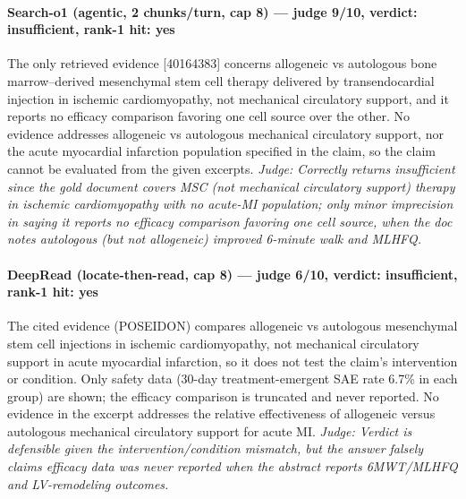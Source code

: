 \documentclass[sigconf, review, anonymous]{acmart}
\begin{document}
\paragraph{Search-o1 (agentic, 2 chunks/turn, cap 8) --- judge 9/10, verdict: insufficient, rank-1 hit: yes}
\noindent The only retrieved evidence [40164383] concerns allogeneic vs autologous bone marrow--derived mesenchymal stem cell therapy delivered by transendocardial injection in ischemic cardiomyopathy, not mechanical circulatory support, and it reports no efficacy comparison favoring one cell source over the other. No evidence addresses allogeneic vs autologous mechanical circulatory support, nor the acute myocardial infarction population specified in the claim, so the claim cannot be evaluated from the given excerpts.
\noindent\small\textit{Judge: Correctly returns insufficient since the gold document covers MSC (not mechanical circulatory support) therapy in ischemic cardiomyopathy with no acute-MI population; only minor imprecision in saying it reports no efficacy comparison favoring one cell source, when the doc notes autologous (but not allogeneic) improved 6-minute walk and MLHFQ.}
\paragraph{DeepRead (locate-then-read, cap 8) --- judge 6/10, verdict: insufficient, rank-1 hit: yes}
\noindent The cited evidence (POSEIDON) compares allogeneic vs autologous mesenchymal stem cell injections in ischemic cardiomyopathy, not mechanical circulatory support in acute myocardial infarction, so it does not test the claim's intervention or condition. Only safety data (30-day treatment-emergent SAE rate 6.7\% in each group) are shown; the efficacy comparison is truncated and never reported. No evidence in the excerpt addresses the relative effectiveness of allogeneic versus autologous mechanical circulatory support for acute MI.
\noindent\small\textit{Judge: Verdict is defensible given the intervention/condition mismatch, but the answer falsely claims efficacy data was never reported when the abstract reports 6MWT/MLHFQ and LV-remodeling outcomes.}
\end{document}
